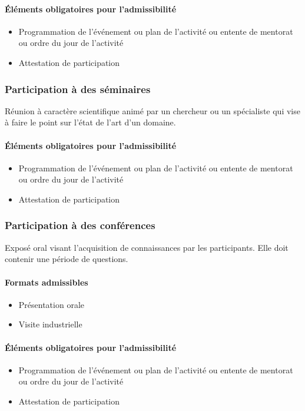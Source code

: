		\paragraph{Éléments obligatoires pour l’admissibilité}
		\begin{itemize}
			\item Programmation de l'événement ou plan de l’activité ou entente de mentorat ou ordre du jour de l’activité
			\item Attestation de participation
		\end{itemize}
		
		\subsubsection{Participation à des séminaires}
		Réunion à caractère scientifique animé par un chercheur ou un spécialiste qui vise à faire le point sur l’état de l’art d’un domaine.

		\paragraph{Éléments obligatoires pour l’admissibilité}
		\begin{itemize}
			\item Programmation de l'événement ou plan de l’activité ou entente de mentorat ou ordre du jour de l’activité
			\item Attestation de participation
		\end{itemize}		
		
		\subsubsection{Participation à des conférences}
		Exposé oral visant l’acquisition de connaissances par les participants. Elle doit contenir une période de questions.
		
		\paragraph{Formats admissibles}
		\begin{itemize}
			\item Présentation orale
			\item Visite industrielle
		\end{itemize}
		
		\paragraph{Éléments obligatoires pour l’admissibilité}
		\begin{itemize}
			\item Programmation de l'événement ou plan de l’activité ou entente de mentorat ou ordre du jour de l’activité
			\item Attestation de participation
		\end{itemize}		
		
